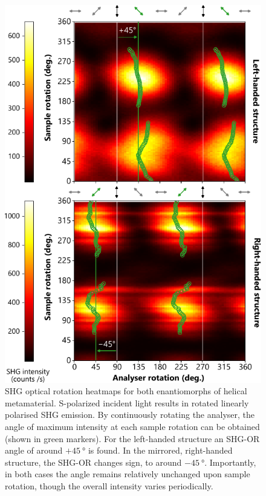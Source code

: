 \begin{figure}[htb!]	
    \centering	
    \includegraphics[scale=1]{./figures/results/OAinPlanarNanohelices/s_data.pdf}

    \caption{\label{fig:results:OAinPlanarNanohelices:s_data}
    SHG optical rotation heatmaps for both enantiomorphs of helical metamaterial. S-polarized incident light results in rotated linearly polarised SHG emission. By continuously rotating the analyser, the angle of maximum intensity at each sample rotation can be obtained (shown in green markers). For the left-handed structure an SHG-OR angle of around $+\SI{45}{\degree}$ is found. In the mirrored, right-handed structure, the SHG-OR changes sign, to around $-\SI{45}{\degree}$. Importantly, in both cases the angle remains relatively unchanged upon sample rotation, though the overall intensity varies periodically.}	
\end{figure}

